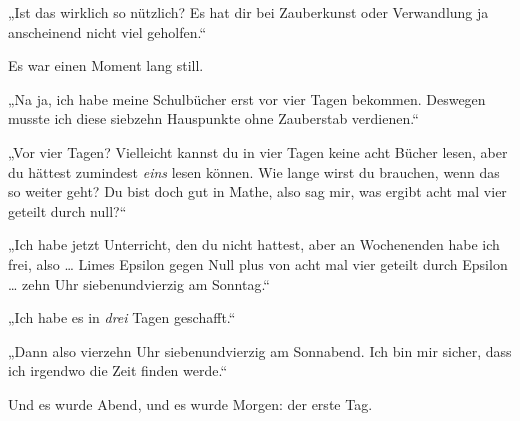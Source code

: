 „Ist das wirklich so nützlich? Es hat dir bei Zauberkunst oder Verwandlung ja anscheinend nicht viel geholfen.“ 

Es war einen Moment lang still. 

„Na ja, ich habe meine Schulbücher erst vor vier Tagen bekommen. Deswegen musste ich diese siebzehn Hauspunkte ohne Zauberstab verdienen.“ 

„Vor vier Tagen? Vielleicht kannst du in vier Tagen keine acht Bücher lesen, aber du hättest zumindest \emph{eins} lesen können. Wie lange wirst du brauchen, wenn das so weiter geht? Du bist doch gut in Mathe, also sag mir, was ergibt acht mal vier geteilt durch null?“ 

„Ich habe jetzt Unterricht, den du nicht hattest, aber an Wochenenden habe ich frei, also … Limes Epsilon gegen Null plus von acht mal vier geteilt durch Epsilon … zehn Uhr siebenundvierzig am Sonntag.“ 

„Ich habe es in \emph{drei} Tagen geschafft.“ 

„Dann also vierzehn Uhr siebenundvierzig am Sonnabend. Ich bin mir sicher, dass ich irgendwo die Zeit finden werde.“ 

Und es wurde Abend, und es wurde Morgen: der erste Tag.

